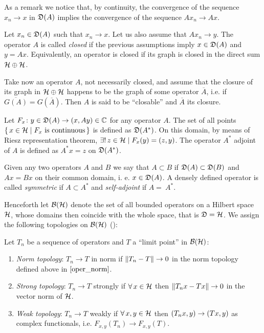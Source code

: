 As a remark we notice that, by continuity, the convergence of
the sequence $x_n\rightarrow x$ in $\mathfrak{D}(A)$ implies the 
convergence of the sequence $A x_n\rightarrow A x$. 

 \begin{definition}
 Let $x_n\in\mathfrak{D}(A)$ such that $x_n\rightarrow x$. Let us also
 assume that $A x_n\rightarrow y$. The operator $A$ is called
 \emph{closed} if the previous assumptions imply $x\in\mathfrak{D}(A)$ and
 $y=A x$. Equivalently, an operator is closed if its graph is
 closed in the direct sum $\mathcal{H}\oplus\mathcal{H}$.
 \end{definition}
 
Take now an operator $A$, not necessarily closed, and assume that
the closure of its graph in $\mathcal{H}\oplus\mathcal{H}$ happens to be the graph 
of some operator $\overline{A}$, i.e. if $\overline{G(A)}=G(\overline{A})$.
Then $A$ is said to be ``closable'' and $\overline{A}$ its closure.

 \begin{definition}
 Let $F_x\colon y\in\mathfrak{D}(A)\to(x,Ay)\in\mathbb{C}$ for any operator
 $A$. The set of all points $\set{x\in\mathcal{H}\mid F_x\text{ is continuous}}$ 
 is defined as $\mathfrak{D}(A^*)$. On this domain, by means of Riesz 
 representation theorem, $\exists !\,z\in\mathcal{H}\mid F_x(y)=(z,y)$.
 The operator $A^*$ adjoint of $A$ is defined as $A^*x=z$ on $\mathfrak{D}(A^*)$.
 \end{definition}
 
Given any two operators $A$ and $B$ we say that $A\subset B$ if
$\mathfrak{D}(A)\subset\mathfrak{D}(B)$ and $Ax=Bx$ on their common domain, i. e.
$x\in\mathfrak{D}(A)$. A densely defined operator is called \emph{symmetric} 
if $A\subset A^*$ and \emph{self-adjoint} if $A=~A^*$.

\bigskip
Henceforth let $\bh$ denote the set of all bounded operators
on a Hilbert space $\mathcal{H}$, whose domains then coincide with the 
whole space, that is $\mathfrak{D}=\mathcal{H}$. We assign the following topologies
on $\bh$ (\cite*{Jones:vN}):
 \begin{definition}[Topologies on $\bh$]
 Let $T_n$ be a sequence of operators and $T$ a ``limit point''
 in $\bh$: 
  \begin{enumerate}
  \item \emph{Norm topology}: $T_n\rightarrow T$ in norm if 
        $\lVert T_n-T\rVert\rightarrow 0$ in the norm topology
        defined above in $\eqref{oper_norm}$.  
  \item \emph{Strong topology}: $T_n\rightarrow T$ strongly
        if $\forall\,x\in\mathcal{H}$ then $\lVert T_n x- Tx\rVert\rightarrow 0$ 
        in the vector norm of $\mathcal{H}$.
  \item \emph{Weak topology}: $T_n\rightarrow T$ weakly if $\forall\,
        x,y \in \mathcal{H}$ then $(T_n x,y)\rightarrow(Tx,y)$
        as complex functionals, i.e. $F_{x,y}(T_n)\rightarrow F_{x,y}(T)$.
  \end{enumerate}
 \end{definition}
 

